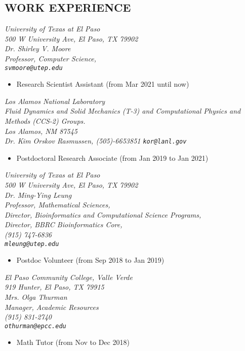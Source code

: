 \documentclass[margin]{res}
\begin{document}
\begin{resume}
\section{WORK EXPERIENCE}
{\sl University of Texas at El Paso\\
500 W University Ave, El Paso, TX  79902\\
Dr. Shirley V. Moore\\
Professor, Computer Science,\\
\verb+svmoore@utep.edu+
} \hfill  
\begin{itemize}
\item Research Scientist Assistant (from Mar 2021 until now)
\end{itemize}

{\sl Los Alamos National Laboratory \\
Fluid Dynamics and Solid Mechanics (T-3) and
Computational Physics and Methods (CCS-2) Groups.\\
Los Alamos, NM 87545\\
Dr. Kim Orskov Rasmussen, (505)-6653851
\verb+kor@lanl.gov +
} \hfill  
\begin{itemize}
\item Postdoctoral Research Associate (from Jan 2019 to Jan 2021)
\end{itemize}

{\sl University of Texas at El Paso\\
500 W University Ave, El Paso, TX  79902\\
Dr. Ming-Ying Leung\\
Professor, Mathematical Sciences,\\
Director, Bioinformatics and Computational Science Programs,\\
Director, BBRC Bioinformatics Core,\\
(915) 747-6836\\%
\verb+mleung@utep.edu+
} \hfill  
\begin{itemize}
\item Postdoc Volunteer (from Sep 2018 to Jan 2019)
\end{itemize}

{\sl El Paso Community College, Valle Verde\\
919 Hunter,  El Paso, TX 79915\\
Mrs. Olga Thurman\\
Manager, Academic Resources\\
(915) 831-2740\\
\verb+othurman@epcc.edu+
} \hfill  
\begin{itemize}
\item Math Tutor (from Nov to Dec 2018)
\end{itemize}


\end{resume}
\end{document}

